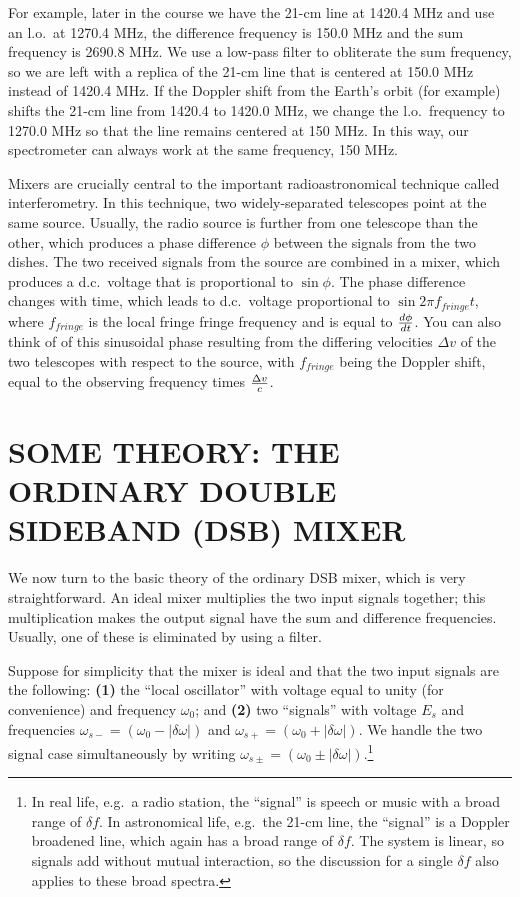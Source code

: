 \documentclass[11pt,preprint]{aastex}
\begin{document}
        For example, later in the course we have the 21-cm line at
1420.4 MHz and use an l.o.\ at 1270.4 MHz, the difference frequency is
150.0 MHz and the sum frequency is 2690.8 MHz.  We use a low-pass filter
to obliterate the sum frequency, so we are left with a replica of the
21-cm line that is centered at 150.0 MHz instead of 1420.4 MHz.  If the
Doppler shift from the Earth's orbit (for example) shifts the 21-cm line
from 1420.4 to 1420.0 MHz, we change the l.o.\ frequency to 1270.0 MHz
so that the line remains centered at 150 MHz.  In this way, our
spectrometer can always work at the same frequency, 150 MHz.

        Mixers are crucially central to the important radioastronomical
technique called interferometry.  In this technique, two
widely-separated telescopes point at the same source.  Usually, the
radio source is further from one telescope than the other, which
produces a phase difference $\phi$ between the signals from the two
dishes.  The two received signals from the source are combined in a
mixer, which produces a d.c.\ voltage that is proportional to $\sin
\phi$. The phase difference changes with time, which leads to d.c.\
voltage proportional to $\sin 2\pi f_{fringe}t$, where $f_{fringe}$ is
the local fringe fringe frequency and is equal to $d\phi \over dt$.  You
can also think of of this sinusoidal phase resulting from the differing
velocities $\Delta v$ of the two telescopes with respect to the source,
with $f_{fringe}$ being the Doppler shift, equal to the observing
frequency times $\Delta v \over c$.

\section { SOME THEORY: THE ORDINARY DOUBLE SIDEBAND (DSB) MIXER}

        We now turn to the basic theory of the ordinary DSB mixer, which
is very straightforward.  An ideal mixer multiplies the two input
signals together; this multiplication makes the output signal have the
sum and difference frequencies.  Usually, one of these is eliminated by
using a filter.

        Suppose for simplicity that the mixer is ideal and that the two
input signals are the following: {\bf (1)} the ``local oscillator'' with
voltage equal to unity (for convenience) and frequency $\omega_0$; and
{\bf (2)} two ``signals'' with voltage $E_s$ and frequencies
$\omega_{s-} = (\omega_0 - |\delta \omega |)$ and $\omega_{s+} =
(\omega_0 + |\delta \omega |)$. We handle the two signal case
simultaneously by writing $\omega_{s \pm} = (\omega_0 \pm |\delta \omega
|)$.\footnote{In real life, e.g.\ a radio station, the ``signal'' is
speech or music with a broad range of $\delta f$. In astronomical life,
e.g.\ the 21-cm line, the ``signal'' is a Doppler broadened line, which
again has a broad range of $\delta f$. The system is linear, so signals
add without mutual interaction, so the discussion for a single $\delta
f$ also applies to these broad spectra.}
\end{document}
